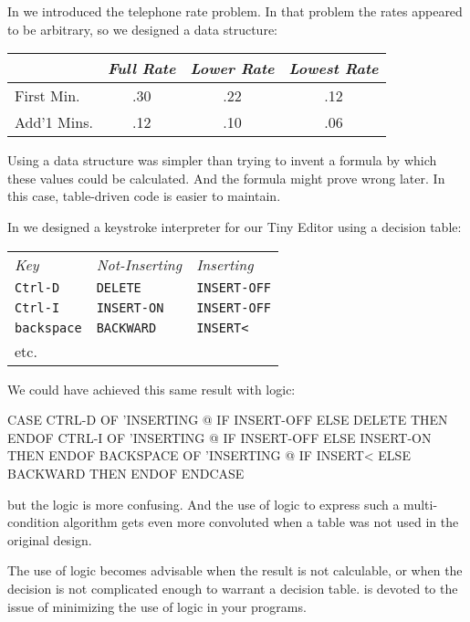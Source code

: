 In  we introduced the telephone rate problem. In that
problem the rates appeared to be arbitrary, so we designed a data
structure:

\bigskip
\begin{tabular}{lccc}
          & \emph{Full Rate} & \emph{Lower Rate} & \emph{Lowest Rate} \\ \hline
First Min.  &       .30        &        .22        &          .12 \\ \hline
Add'1 Mins. &       .12        &        .10        &          .06 \\ \hline
\end{tabular}\label{phone3}
\bigskip

\noindent Using a data structure was simpler than trying to invent a
formula by which these values could be calculated. And the formula might
prove wrong later. In this case, table-driven code is easier to maintain.

In  we designed a keystroke interpreter for our Tiny
Editor using a decision table:\label{editor3}

\medskip
\begin{tabular}{lll}
\emph{Key}         & \emph{Not-Inserting} & \emph{Inserting} \\
\texttt{Ctrl-D}    & \texttt{DELETE}      & \texttt{INSERT-OFF} \\
\texttt{Ctrl-I}    & \texttt{INSERT-ON}   & \texttt{INSERT-OFF} \\
\texttt{backspace} & \texttt{BACKWARD}    & \texttt{INSERT<} \\
etc. & &
\end{tabular}
\medskip

\medbreak\noindent
We could have achieved this same result with logic:
\begin{Code}
CASE
   CTRL-D     OF  'INSERTING @  IF
      INSERT-OFF   ELSE DELETE     THEN   ENDOF
   CTRL-I     OF  'INSERTING @  IF
      INSERT-OFF   ELSE INSERT-ON  THEN   ENDOF
   BACKSPACE  OF  'INSERTING @  IF
      INSERT<      ELSE BACKWARD   THEN   ENDOF
ENDCASE
\end{Code}
but the logic is more confusing. And the use of logic to express such a
multi-condition algorithm gets even more convoluted when a table was
not used in the original design.

The use of logic becomes advisable when the result is not calculable,
or when the decision is not complicated enough to warrant a decision
table.  is devoted to the issue of minimizing the use of logic
in your programs.

